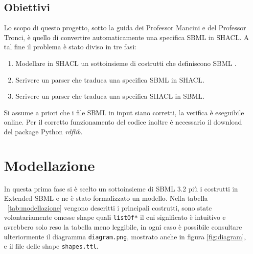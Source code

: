 \documentclass{article}
\begin{document}
\subsection{Obiettivi}

Lo scopo di questo progetto, sotto la guida dei Professor Mancini e del Professor Tronci, è quello di convertire automaticamente una specifica SBML in SHACL. A tal fine il problema è stato diviso in tre fasi:

\begin{enumerate}
    \item Modellare in SHACL un sottoinsieme di costrutti che definiscono SBML . 
    \item Scrivere un parser che traduca una specifica SBML in SHACL.
    \item Scrivere un parser che traduca una specifica SHACL in SBML.
\end{enumerate}

Si assume a priori che i file SBML in input siano corretti, la \href{http://sbml.org/Facilities/Validator}{verifica} è eseguibile online. Per il corretto funzionamento del codice inoltre è necessario il download del package Python \textit{rdflib}.

\clearpage
\section{Modellazione}

In questa prima fase si è scelto un sottoinsieme di SBML 3.2 più i costrutti in Extended SBML e ne è stato formalizzato un modello. Nella tabella ~\ref{tab:modellazione} vengono descritti i principali costrutti, sono state volontariamente omesse shape quali \texttt{listOf*} il cui significato è intuitivo e avrebbero solo reso la tabella meno leggibile, in ogni caso è possibile consultare ulteriormente il diagramma \texttt{diagram.png}, mostrato anche in figura \ref{fig:diagram}, e il file delle shape \texttt{shapes.ttl}.
\end{document}
